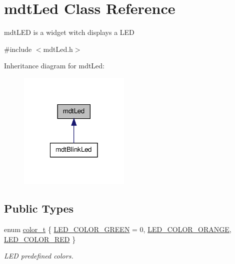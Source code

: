 \hypertarget{classmdt_led}{
\section{mdtLed Class Reference}
\label{classmdt_led}
}


mdtLED is a widget witch displays a LED  




{\ttfamily \#include $<$mdtLed.h$>$}



Inheritance diagram for mdtLed:\nopagebreak
\begin{figure}[H]
\begin{center}
\leavevmode
\includegraphics[width=150pt]{classmdt_led__inherit__graph}
\end{center}
\end{figure}
\subsection*{Public Types}
\begin{DoxyCompactItemize}
\item 
enum \hyperlink{classmdt_led_a2d57d9ef04d2105d2fad93b57fc7cfef}{color\_\-t} \{ \hyperlink{classmdt_led_a2d57d9ef04d2105d2fad93b57fc7cfefaee73db242171b49a26ca3285edc877e7}{LED\_\-COLOR\_\-GREEN} =  0, 
\hyperlink{classmdt_led_a2d57d9ef04d2105d2fad93b57fc7cfefa350264f3c85b168b7068033fbf1c0cd2}{LED\_\-COLOR\_\-ORANGE}, 
\hyperlink{classmdt_led_a2d57d9ef04d2105d2fad93b57fc7cfefa6fc68c065d1344f2bdb985460d34d494}{LED\_\-COLOR\_\-RED}
 \}
\begin{DoxyCompactList}\small\item\em LED predefined colors. \end{DoxyCompactList}\end{DoxyCompactItemize}
